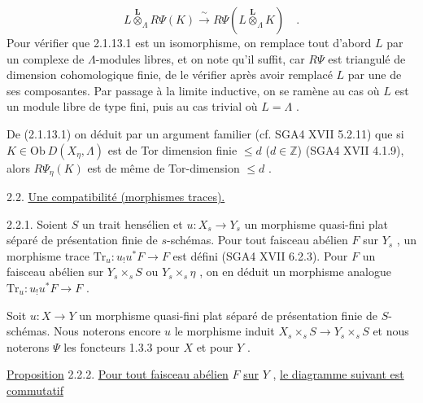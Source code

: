 
\begin{equation}\tag{2.1.13.1}
 L \overset{\mathbf{L}}{\otimes}_{\Lambda} R\Psi(K) \xrightarrow{\ \sim\ } R\Psi(L \overset{\mathbf{L}}{\otimes}_{\Lambda} K) \quad .
\end{equation}
Pour vérifier que 2.1.13.1 est un isomorphisme, on remplace tout d'abord $L$ par un complexe de $\Lambda$-modules libres, et on note qu'il suffit, car $R\Psi$ est triangulé de dimension cohomologique finie, de le vérifier après avoir remplacé $L$ par une de ses composantes. Par passage à la limite inductive, on se ramène au cas où $L$ est un module libre de type fini, puis au cas trivial où $L = \Lambda$ .

De (2.1.13.1) on déduit par un argument familier (cf. SGA4 XVII 5.2.11) que si $K \in \mathrm{Ob}\ D (X_\eta, \Lambda)$ est de Tor dimension finie $\leq d$ ($d \in \mathbb{Z}$) (SGA4 XVII 4.1.9), alors $R\Psi_\eta(K)$ est de même de Tor-dimension $\leq d$ .


2.2. \underline{Une compatibilité (morphismes traces).}

2.2.1. Soient $S$ un trait hensélien et $u : X_s \to Y_s$ un morphisme quasi-fini plat séparé de présentation finie de $s$-schémas. Pour tout faisceau abélien $F$ sur $Y_s$ , un morphisme trace $\mathrm{Tr}_u : u_! u^* F \to F$ est défini (SGA4 XVII 6.2.3). Pour $F$ un faisceau abélien sur $Y_s \times_s S$ ou $Y_s \times_s \eta$ , on en déduit un morphisme analogue $\mathrm{Tr}_u : u_! u^* F \to F$ .

Soit $u : X \to Y$ un morphisme quasi-fini plat séparé de présentation finie de $S$-schémas. Nous noterons encore $u$ le morphisme induit $X_s \times_s S \to Y_s \times_s S$ et nous noterons $\Psi$ les foncteurs 1.3.3 pour $X$ et pour $Y$ .

\underline{Proposition} 2.2.2. \underline{Pour tout faisceau abélien} $F$ \underline{sur} $Y$ , \underline{le diagramme suivant est commutatif}

